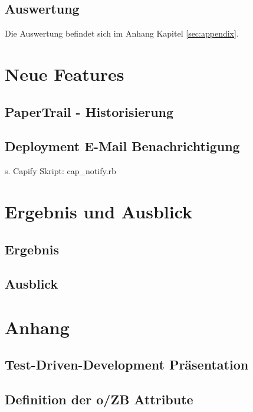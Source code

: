 \documentclass[12pt,             %
               a4paper,          %
               listof=totoc,     %
               index=totoc,      %
               bibliography=totoc,%
               oneside,         %
               BCOR1cm,          %
               english   %
               ]{scrbook}
\begin{document}
\section{Auswertung}
Die Auswertung befindet sich im Anhang Kapitel \vref{sec:appendix}.

\chapter{Neue Features}
\section{PaperTrail - Historisierung}

\clearpage

\section{Deployment E-Mail Benachrichtigung}
s. Capify Skript: \glqq cap\_notify.rb\grqq

\chapter{Ergebnis und Ausblick}
\section{Ergebnis}
\section{Ausblick}

\clearpage
\appendix
\chapter{Anhang}\label{sec:appendix}
\section{Test-Driven-Development Präsentation}

\clearpage
\section{Definition der o/ZB Attribute}
\label{chapter:ozb_attribute}


\newpage
\listoffigures

\newpage
\listoftables

\newpage
\lstlistoflistings

\newpage

\end{document}
